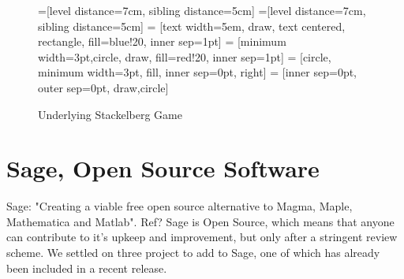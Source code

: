 \documentclass[a0,landscape]{a0poster}
\begin{document}
\vspace{1cm}
\begin{multicols}{2}


\begin{figure}[H]
    \begin{center}
        =[level distance=7cm, sibling distance=5cm]
        =[level distance=7cm, sibling distance=5cm]
         = [text width=5em, draw, text centered, rectangle, fill=blue!20, inner sep=1pt]
         = [minimum width=3pt,circle,  draw, fill=red!20, inner sep=1pt]
         = [circle, minimum width=3pt, fill, inner sep=0pt, right]
         = [inner sep=0pt, outer sep=0pt, draw,circle]
        \caption{Underlying Stackelberg Game}\label{fig:stackelberg_game}
    \end{center}
\end{figure}


\color{Brown}
\section*{Sage, Open Source Software}
Sage: "Creating a viable free open source alternative to Magma, Maple, Mathematica and Matlab".
Ref?
Sage is Open Source, which means that anyone can contribute to it's upkeep and improvement, but only after a stringent review scheme.
We settled on three project to add to Sage, one of which has already been included in a recent release.


\end{multicols}
\end{document}
